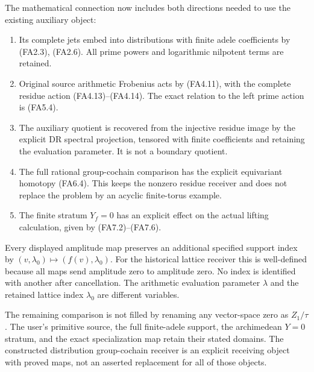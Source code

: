 The mathematical connection now includes both directions needed to use
the existing auxiliary object:

\begin{enumerate}
\def\labelenumi{\arabic{enumi}.}
\tightlist
\item
  Its complete jets embed into distributions with finite adele
  coefficients by (FA2.3), (FA2.6). All prime powers and logarithmic
  nilpotent terms are retained.
\item
  Original source arithmetic Frobenius acts by (FA4.11), with the
  complete residue action (FA4.13)--(FA4.14). The exact relation to the
  left prime action is (FA5.4).
\item
  The auxiliary quotient is recovered from the injective residue image
  by the explicit DR spectral projection, tensored with finite
  coefficients and retaining the evaluation parameter. It is not a
  boundary quotient.
\item
  The full rational group-cochain comparison has the explicit
  equivariant homotopy (FA6.4). This keeps the nonzero residue receiver
  and does not replace the problem by an acyclic finite-torus example.
\item
  The finite stratum \(Y_f=0\) has an explicit effect on the actual
  lifting calculation, given by (FA7.2)--(FA7.6).
\end{enumerate}

Every displayed amplitude map preserves an additional specified support
index by \((v,\lambda_0)\mapsto(f(v),\lambda_0)\). For the historical
lattice receiver this is well-defined because all maps send amplitude
zero to amplitude zero. No index is identified with another after
cancellation. The arithmetic evaluation parameter \(\lambda\) and the
retained lattice index \(\lambda_0\) are different variables.

The remaining comparison is not filled by renaming any vector-space zero
as \(Z_1/\tau\). The user's primitive source, the full finite-adele
support, the archimedean \(Y=0\) stratum, and the exact specialization
map retain their stated domains. The constructed distribution
group-cochain receiver is an explicit receiving object with proved maps,
not an asserted replacement for all of those objects.
